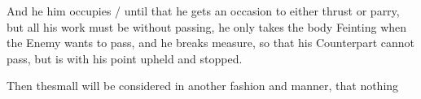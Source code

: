 And he him occupies / until that he gets an occasion to either thrust
or parry, but all his work must be without passing, he only takes the
body Feinting when the
Enemy wants to pass, and he breaks measure, so that his Counterpart
cannot pass, but is with his point upheld and stopped.

Then thesmall will be considered in another fashion and manner, that
nothing
